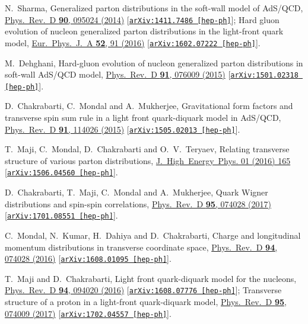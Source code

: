\documentclass[aps,prl,reprint,groupedaddress, preprintnumbers]{revtex4-1}
\begin{document}
\begin{thebibliography}{50}
  N.~Sharma,
  Generalized parton distributions in the soft-wall model of AdS/QCD,
  \href{https://doi.org/10.1103/PhysRevD.90.095024}{Phys.\ Rev.\ D {\bf 90}, 095024 (2014)}
  [\href{https://arxiv.org/abs/1411.7486}{\tt arXiv:1411.7486 [hep-ph]}];
  Hard gluon evolution of nucleon generalized parton distributions in the light-front quark model,
  \href{https://doi.org/10.1140/epja/i2016-16091-4}{Eur.\ Phys.\ J.\ A {\bf 52}, 91 (2016)}
  [\href{https://arxiv.org/abs/1602.07222}{\tt arXiv:1602.07222 [hep-ph]}].


  M.~Dehghani,
  Hard-gluon evolution of nucleon generalized parton distributions in soft-wall AdS/QCD model,
  \href{https://doi.org/10.1103/PhysRevD.91.076009}{Phys.\ Rev.\ D {\bf 91}, 076009 (2015)}
  [\href{https://arxiv.org/abs/1501.02318}{\tt arXiv:1501.02318 [hep-ph]}].


  D.~Chakrabarti, C.~Mondal and A.~Mukherjee,
  Gravitational form factors and transverse spin sum rule in a light front quark-diquark model in AdS/QCD,
  \href{https://doi.org/10.1103/PhysRevD.91.114026}{Phys.\ Rev.\ D {\bf 91}, 114026 (2015)}
  [\href{https://arxiv.org/abs/1505.02013}{\tt arXiv:1505.02013 [hep-ph]}].


  T.~Maji, C.~Mondal, D.~Chakrabarti and O.~V.~Teryaev,
  Relating transverse structure of various parton distributions,
  \href{https://doi.org/10.1007/JHEP01(2016)165}{J.\ High\ Energy\ Phys. 01 (2016) 165}
  [\href{https://arxiv.org/abs/1506.04560}{\tt arXiv:1506.04560 [hep-ph]}].


  D.~Chakrabarti, T.~Maji, C.~Mondal and A.~Mukherjee,
  Quark Wigner distributions and spin-spin correlations,
  \href{https://doi.org/10.1103/PhysRevD.95.074028}{Phys.\ Rev.\ D {\bf 95}, 074028 (2017)}
  [\href{https://arxiv.org/abs/1701.08551}{\tt arXiv:1701.08551 [hep-ph]}].


  C.~Mondal, N.~Kumar, H.~Dahiya and D.~Chakrabarti,
  Charge and longitudinal momentum distributions in transverse coordinate space,
  \href{https://doi.org/10.1103/PhysRevD.94.074028}{Phys.\ Rev.\ D {\bf 94},  074028 (2016)}
  [\href{https://arxiv.org/abs/1608.01095}{\tt arXiv:1608.01095 [hep-ph]}].


  T.~Maji and D.~Chakrabarti,
  Light front quark-diquark model for the nucleons,
  \href{https://doi.org/10.1103/PhysRevD.94.094020}{Phys.\ Rev.\ D {\bf 94}, 094020 (2016)}
  [\href{https://arxiv.org/abs/1608.07776}{\tt arXiv:1608.07776 [hep-ph]}];
  Transverse structure of a proton in a light-front quark-diquark model,
  \href{https://doi.org/10.1103/PhysRevD.95.074009}{Phys.\ Rev.\ D {\bf 95}, 074009 (2017)}
  [\href{https://arxiv.org/abs/1702.04557}{\tt arXiv:1702.04557 [hep-ph]}].



\end{thebibliography}
\end{document}
